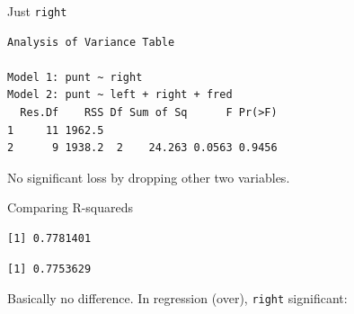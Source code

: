 \begin{frame}[fragile]{Just \texttt{right}}

  {\small
 
\begin{knitrout}
\color{fgcolor}\begin{kframe}
\begin{alltt}
\hlkwb{=}\hlopt{~}
\end{alltt}
\begin{verbatim}
Analysis of Variance Table

Model 1: punt ~ right
Model 2: punt ~ left + right + fred
  Res.Df    RSS Df Sum of Sq      F Pr(>F)
1     11 1962.5                           
2      9 1938.2  2    24.263 0.0563 0.9456
\end{verbatim}
\end{kframe}
\end{knitrout}
}
  

No significant loss by dropping other two variables.

\end{frame}

\begin{frame}[fragile]{Comparing R-squareds}


{\small
\begin{knitrout}
\color{fgcolor}\begin{kframe}
\begin{alltt}
\hlopt{$}
\end{alltt}
\begin{verbatim}
[1] 0.7781401
\end{verbatim}
\begin{alltt}
\hlopt{$}
\end{alltt}
\begin{verbatim}
[1] 0.7753629
\end{verbatim}
\end{kframe}
\end{knitrout}
}

Basically no difference. In regression (over), \texttt{right} significant:
  

  
\end{frame}

